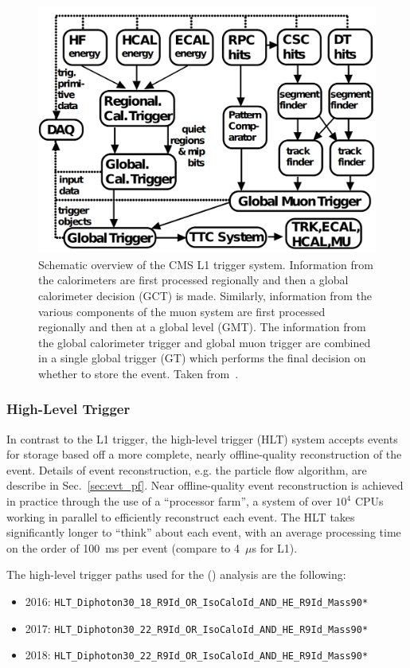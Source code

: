 \begin{figure} [htbp!]
    \centering
    \includegraphics[width=0.6\linewidth]{figures/cms/cms_l1_trigger.png}
    \caption[Schematic overview of the CMS L1 trigger system. Taken from~\cite{Khachatryan:2016bia}.]{Schematic overview of the CMS L1 trigger system. Information from the calorimeters are first processed regionally and then a global calorimeter decision (GCT) is made. Similarly, information from the various components of the muon system are first processed regionally and then at a global level (GMT). The information from the global calorimeter trigger and global muon trigger are combined in a single global trigger (GT) which performs the final decision on whether to store the event. Taken from~\cite{Khachatryan:2016bia}.}
    \label{fig:cms_l1_trigger}
\end{figure}

\subsubsection{High-Level Trigger}
In contrast to the L1 trigger, the high-level trigger (HLT) system accepts events for storage based off a more complete, nearly offline-quality reconstruction of the event.
Details of event reconstruction, e.g. the particle flow algorithm, are describe in Sec.~\ref{sec:evt_pf}.
Near offline-quality event reconstruction is achieved in practice through the use of a ``processor farm'', a system of over $10^4$ CPUs working in parallel to efficiently reconstruct each event.
The HLT takes significantly longer to ``think'' about each event, with an average processing time on the order of 100~ms per event (compare to 4~$\mu$s for L1).

The high-level trigger paths used for the \ttH (\Hgg) analysis are the following:
\begin{itemize}
    \item 2016: \texttt{HLT\_Diphoton30\_18\_R9Id\_OR\_IsoCaloId\_AND\_HE\_R9Id\_Mass90*}
    \item 2017: \texttt{HLT\_Diphoton30\_22\_R9Id\_OR\_IsoCaloId\_AND\_HE\_R9Id\_Mass90*}
    \item 2018: \texttt{HLT\_Diphoton30\_22\_R9Id\_OR\_IsoCaloId\_AND\_HE\_R9Id\_Mass90*}
\end{itemize}

